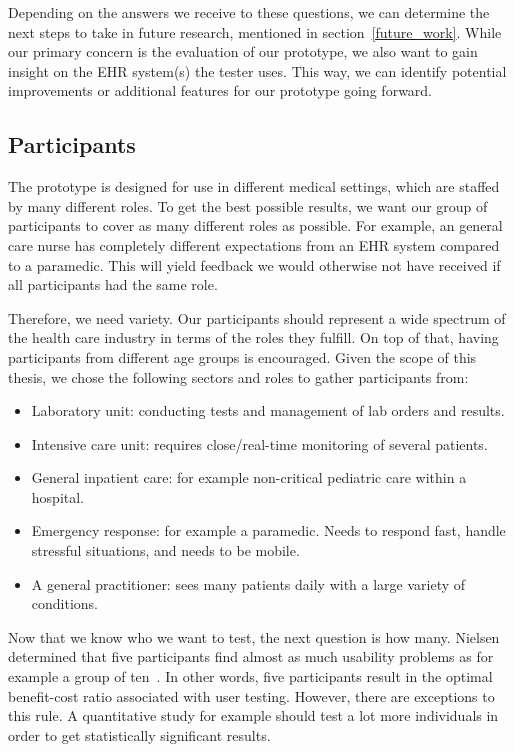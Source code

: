     \noindent Depending on the answers we receive to these questions, we can determine the next steps to take in future research, mentioned in section~\ref{future_work}. While our primary concern is the evaluation of our prototype, we also want to gain insight on the EHR system(s) the tester uses. This way, we can identify potential improvements or additional features for our prototype going forward. %

    \subsection{Participants}\label{test_participants}

    The prototype is designed for use in different medical settings, which are staffed by many different roles. To get the best possible results, we want our group of participants to cover as many different roles as possible. For example, an general care nurse has completely different expectations from an EHR system compared to a paramedic. This will yield feedback we would otherwise not have received if all participants had the same role.

    Therefore, we need variety. Our participants should represent a wide spectrum of the health care industry in terms of the roles they fulfill. On top of that, having participants from different age groups is encouraged. Given the scope of this thesis, we chose the following sectors and roles to gather participants from:
    \begin{itemize}
        \item Laboratory unit: conducting tests and management of lab orders and results.
        \item Intensive care unit: requires close/real-time monitoring of several patients.
        \item General inpatient care: for example non-critical pediatric care within a hospital.
        \item Emergency response: for example a paramedic. Needs to respond fast, handle stressful situations, and needs to be mobile.
        \item A general practitioner: sees many patients daily with a large variety of conditions.
    \end{itemize}

    \noindent Now that we know who we want to test, the next question is how many. Nielsen determined that five participants find almost as much usability problems as for example a group of ten~\cite{Nielsen2012,Lazar2017}. In other words, five participants result in the optimal benefit-cost ratio associated with user testing. However, there are exceptions to this rule. A quantitative study for example should test a lot more individuals in order to get statistically significant results.

